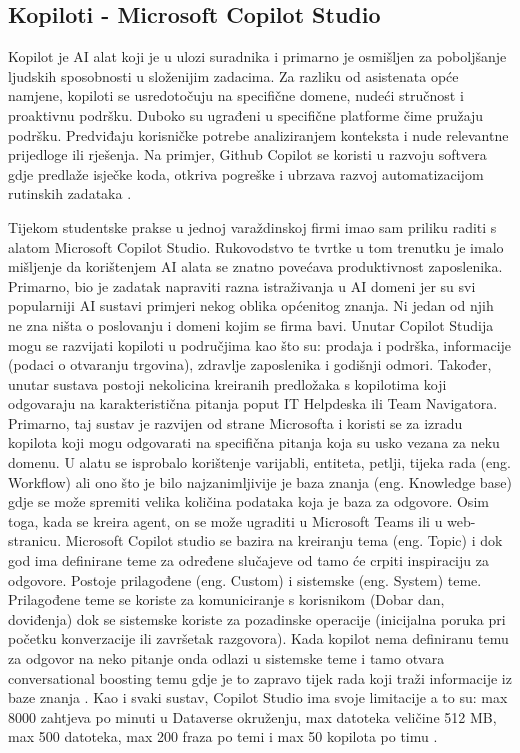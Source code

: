 \documentclass[]{foi}
\begin{document}
\subsection{Kopiloti - Microsoft Copilot Studio}
Kopilot je AI alat koji je u ulozi suradnika i primarno je osmišljen za poboljšanje ljudskih sposobnosti u složenijim zadacima. Za razliku od asistenata opće namjene, kopiloti se usredotočuju na specifične domene,
nudeći stručnost i proaktivnu podršku. Duboko su ugrađeni u specifične platforme čime pružaju podršku. Predviđaju korisničke potrebe analiziranjem konteksta i nude relevantne prijedloge ili rješenja.
Na primjer, Github Copilot se koristi u razvoju softvera gdje predlaže isječke koda, otkriva pogreške i ubrzava razvoj automatizacijom rutinskih zadataka \cite{exomindset2025difference}.

Tijekom studentske prakse u jednoj varaždinskoj firmi imao sam priliku raditi s alatom Microsoft Copilot Studio. Rukovodstvo te tvrtke u tom trenutku je imalo mišljenje da korištenjem 
AI alata se znatno povećava produktivnost zaposlenika. Primarno, bio je zadatak napraviti razna istraživanja u AI domeni jer su svi popularniji AI sustavi primjeri nekog oblika općenitog znanja. 
Ni jedan od njih ne zna ništa o poslovanju i domeni kojim se firma bavi. Unutar Copilot Studija mogu se razvijati kopiloti u područjima kao što su: prodaja i podrška, informacije (podaci o otvaranju trgovina), 
zdravlje zaposlenika i godišnji odmori. Također, unutar sustava postoji nekolicina kreiranih predložaka s kopilotima koji odgovaraju na karakteristična pitanja poput IT Helpdeska ili Team Navigatora. 
Primarno, taj sustav je razvijen od strane Microsofta i koristi se za izradu kopilota koji mogu odgovarati na specifična pitanja koja su usko vezana za neku domenu. U alatu se isprobalo korištenje varijabli, entiteta, 
petlji, tijeka rada (eng. Workflow) ali ono što je bilo najzanimljivije je baza znanja (eng. Knowledge base) gdje se može spremiti velika količina podataka koja je baza za odgovore. Osim toga, kada se kreira agent, on se može 
ugraditi u Microsoft Teams ili u web-stranicu. Microsoft Copilot studio se bazira na kreiranju tema (eng. Topic) i dok god ima definirane teme za određene slučajeve od tamo će crpiti 
inspiraciju za odgovore. Postoje prilagođene (eng. Custom) i sistemske (eng. System) teme. Prilagođene teme se koriste za komuniciranje s korisnikom (Dobar dan, doviđenja) dok se sistemske koriste
za pozadinske operacije (inicijalna poruka pri početku konverzacije ili završetak razgovora). Kada kopilot nema definiranu temu za odgovor na neko pitanje onda odlazi u sistemske teme i tamo 
otvara conversational boosting temu gdje je to zapravo tijek rada koji traži informacije iz baze znanja \cite{copilot2025}. Kao i svaki sustav, Copilot Studio ima svoje limitacije 
a to su: max 8000 zahtjeva po minuti u Dataverse okruženju, max datoteka veličine 512 MB, max 500 datoteka, max 200 fraza po temi i max 50 kopilota po timu \cite{quotas2025}.
\end{document}
